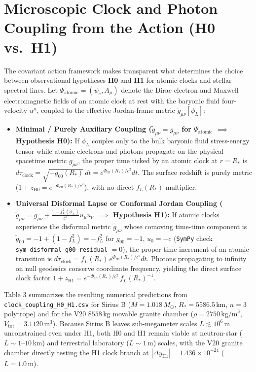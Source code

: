\documentclass[10pt,a4paper]{article}
\begin{document}
\section{Microscopic Clock and Photon Coupling from the Action (H0 vs.\ H1)}
The covariant action framework makes transparent what determines the choice between observational hypotheses \textbf{H0} and \textbf{H1} for atomic clocks and stellar spectral lines. Let $\Psi_{\text{atomic}} = (\psi_e, A_\mu)$ denote the Dirac electron and Maxwell electromagnetic fields of an atomic clock at rest with the baryonic fluid four-velocity $u^\mu$, coupled to the effective Jordan-frame metric $\tilde{g}_{\mu\nu}[\phi_L]$:
\begin{itemize}\setlength{\itemsep}{1pt}\setlength{\parskip}{0pt}
  \item \textbf{Minimal / Purely Auxiliary Coupling ($\tilde{g}_{\mu\nu} = g_{\mu\nu}$ for $\Psi_{\text{atomic}}$ $\implies$ Hypothesis H0):} If $\phi_L$ couples only to the bulk baryonic fluid stress-energy tensor while atomic electrons and photons propagate on the physical spacetime metric $g_{\mu\nu}$, the proper time ticked by an atomic clock at $r = R_*$ is $d\tau_{\text{clock}} = \sqrt{-g_{00}(R_*)}\,dt = e^{\Phi_{\text{eff}}(R_*)/c^2}dt$. The surface redshift is purely metric ($1+z_{\text{H0}} = e^{-\Phi_{\text{eff}}(R_*)/c^2}$), with no direct $f_L(R_*)$ multiplier.
  \item \textbf{Universal Disformal Lapse or Conformal Jordan Coupling ($\tilde{g}_{\mu\nu} = g_{\mu\nu} + \frac{1 - f_L^2(\phi_L)}{c^2}u_\mu u_\nu$ $\implies$ Hypothesis H1):} If atomic clocks experience the disformal metric $\tilde{g}_{\mu\nu}$ whose comoving time-time component is $\tilde{g}_{00} = -1 + (1-f_L^2) = -f_L^2$ for $g_{00}=-1$, $u_0=-c$ (\texttt{SymPy} check \texttt{sym\_disformal\_g00\_residual} $=0$), the proper time increment of an atomic transition is $d\tilde{\tau}_{\text{clock}} = f_L(R_*)\,e^{\Phi_{\text{eff}}(R_*)/c^2}dt$. Photons propagating to infinity on null geodesics conserve coordinate frequency, yielding the direct surface clock factor $1+z_{\text{H1}} = e^{-\Phi_{\text{eff}}(R_*)/c^2}\,f_L(R_*)^{-1}$.
\end{itemize}
Table 3 summarizes the resulting numerical predictions from \texttt{clock\_coupling\_H0\_H1.csv} for Sirius B ($M=1.018\,M_\odot$, $R_*=5586.5\,\text{km}$, $n=3$ polytrope) and for the V20 $8558\,\text{kg}$ movable granite chamber ($\rho=2750\,\text{kg/m}^3$, $V_{\text{tot}}=3.1120\,\text{m}^3$). Because Sirius B leaves sub-megameter scales $L \lesssim 10^6\,\text{m}$ unconstrained even under H1, both H0 and H1 remain viable at neutron-star ($L \sim 1\text{--}10\,\text{km}$) and terrestrial laboratory ($L \sim 1\,\text{m}$) scales, with the V20 granite chamber directly testing the H1 clock branch at $|\Delta y_{\text{H1}}| = 1.436\times 10^{-24}$ ($L=1.0\,\text{m}$).
\end{document}
